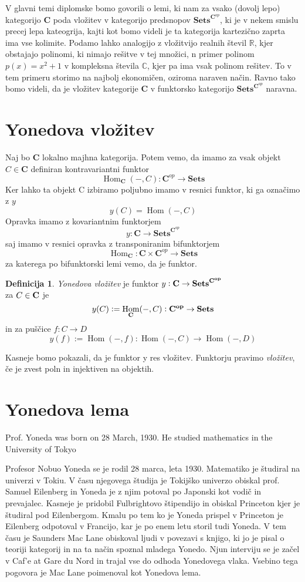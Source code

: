 \documentclass[12pt,a4paper]{book}
\theoremstyle{definition}
\newtheorem{definicija}{Definicija}[chapter]
\theoremstyle{plain}
\theoremstyle{definition}
\theoremstyle{remark}
\newcommand{\cat}[1]{\textbf{#1}}
\DeclareMathOperator{\Hom}{Hom}
\newcommand{\predsnop}[1]{\cat{Sets}^{\cat{#1}^{op}}}
\begin{document}
V glavni temi diplomske bomo govorili o lemi, ki nam za vsako (dovolj lepo) kategorijo $\cat{C}$ poda vložitev v kategorijo predsnopov $\predsnop{C}$, ki je v nekem smislu precej lepa kateogrija, kajti kot bomo videli je ta kategorija kartezično zaprta ima vse kolimite.
Podamo lahko analogijo z vložitvijo realnih števil $\mathbb{R}$, kjer obstajajo polinomi, ki nimajo rešitve v tej množici, n primer polinom $p(x) = x^2 + 1$ v kompleksna števila $\mathbb{C}$, kjer pa ima vsak polinom rešitev. To v tem primeru storimo na najbolj ekonomičen, oziroma naraven način. Ravno tako bomo videli, da je vložitev kategorije $\cat{C}$ v funktorsko kategorijo $\predsnop{C}$ naravna.

\section{Yonedova vložitev}

Naj bo $\mathbf{C}$ lokalno majhna kategorija.
Potem vemo, da imamo za vsak objekt $C \in \cat{C}$ definiran kontravariantni funktor 
$$\Hom_{\cat{C}}(-,C) : \cat{C}^{op} \to \cat{Sets}$$
Ker lahko ta objekt C izbiramo poljubno imamo v resnici funktor, ki ga označimo z $y$
$$y(C) = \Hom(-,C) $$
Opravka imamo z kovariantnim funktorjem 
$$y : \mathbf{C} \to \mathbf{Sets}^{\cat{C}^{op}}$$
saj imamo v resnici opravka z transponiranim bifunktorjem
$$\Hom_{\cat{C}} : \cat{C} \times \cat{C}^{op} \to \cat{Sets}$$
za katerega po bifunktorski lemi vemo, da je funktor.


\begin{definicija} {\it Yonedova vložitev} je funktor $y : \bf{C} \to \bf{Sets}^{\bf{C}^{op}}$ \\  za $C \in \bf{C}$ je $$y(C) := \Hom_{\bf{C}}(-, C) : \bf{C}^{op} \to \bf{Sets}$$ in za puščice $f : C \to D$
$$y(f) := \Hom(-,f) : \Hom(-,C) \to \Hom(-,D)$$
\end{definicija}

Kasneje bomo pokazali, da je funktor y res vložitev. Funktorju pravimo {\it vložitev}, če je zvest poln in injektiven na objektih.

\section{Yonedova lema}

Prof. Yoneda was born on 28 March, 1930.  He studied mathematics in
the University of Tokyo

Profesor Nobuo Yoneda se je rodil 28 marca, leta 1930. Matematiko je študiral na univerzi v Tokiu. V času njegovega študija je Tokijško univerzo obiskal prof. Samuel Eilenberg in Yoneda je z njim potoval po Japonski kot vodič in prevajalec. Kasneje je pridobil Fulbrightovo štipendijo in obiskal Princeton kjer je študiral pod Eilenbergom. Kmalu po tem ko je Yoneda prispel v Princeton je Eilenberg odpotoval v Francijo, kar je po enem letu storil tudi Yoneda. V tem času je Saunders Mac Lane obiskoval ljudi v povezavi s knjigo, ki jo je pisal o teoriji kategorij in na ta način spoznal mladega Yonedo. Njun interviju se je začel v Caf'e at Gare du Nord in trajal vse do odhoda Yonedovega vlaka. Vsebino tega pogovora je Mac Lane poimenoval kot Yonedova lema.
\end{document}
